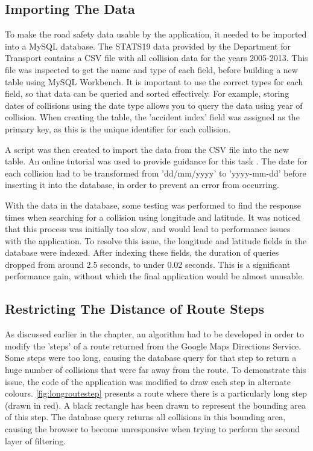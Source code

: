 \documentclass[authoryearcitations]{UoYCSproject}
\begin{document}
\subsection{Importing The Data}

To make the road safety data usable by the application, it needed to be imported into a MySQL database. The STATS19 data provided by the Department for Transport contains a CSV file with all collision data for the years 2005-2013. This file was inspected to get the name and type of each field, before building a new table using MySQL Workbench. It is important to use the correct types for each field, so that data can be queried and sorted effectively. For example, storing dates of collisions using the date type allows you to query the data using year of collision. When creating the table, the 'accident index' field was assigned as the primary key, as this is the unique identifier for each collision.

A script was then created to import the data from the CSV file into the new table. An online tutorial was used to provide guidance for this task \citep{MySQLTutorial}. The date for each collision had to be transformed from 'dd/mm/yyyy' to 'yyyy-mm-dd' before inserting it into the database, in order to prevent an error from occurring.

With the data in the database, some testing was performed to find the response times when searching for a collision using longitude and latitude. It was noticed that this process was initially too slow, and would lead to performance issues with the application. To resolve this issue, the longitude and latitude fields in the database were indexed. After indexing these fields, the duration of queries dropped from around 2.5 seconds, to under 0.02 seconds. This is a significant performance gain, without which the final application would be almost unusable.

\subsection{Restricting The Distance of Route Steps}

As discussed earlier in the chapter, an algorithm had to be developed in order to modify the 'steps' of a route returned from the Google Maps Directions Service. Some steps were too long, causing the database query for that step to return a huge number of collisions that were far away from the route. To demonstrate this issue, the code of the application was modified to draw each step in alternate colours. \autoref{fig:longroutestep} presents a route where there is a particularly long step (drawn in red). A black rectangle has been drawn to represent the bounding area of this step. The database query returns all collisions in this bounding area, causing the browser to become unresponsive when trying to perform the second layer of filtering. 
\end{document}

